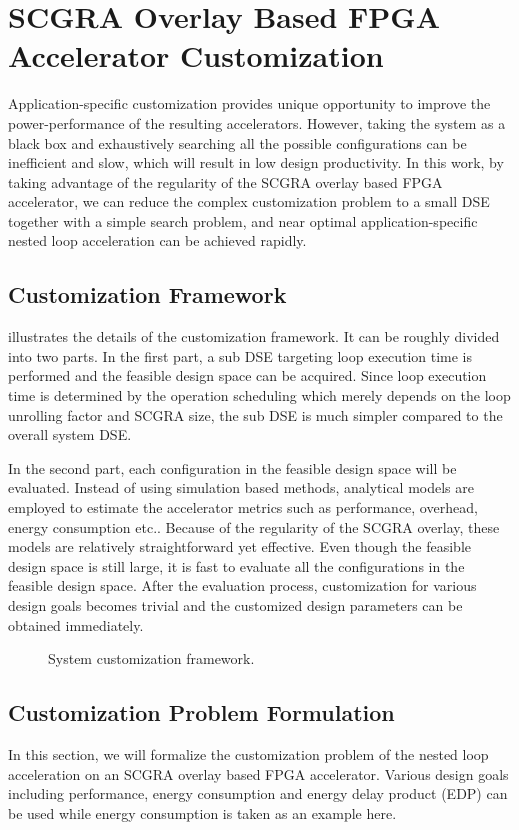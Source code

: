 \section{SCGRA Overlay Based FPGA Accelerator Customization} \label{sec:customization-framework}
Application-specific customization provides unique opportunity to improve 
the power-performance of the resulting accelerators. However, 
taking the system as a black box and exhaustively searching all the 
possible configurations can be inefficient and slow, which will 
result in low design productivity. In this work, by taking advantage 
of the regularity of the SCGRA overlay based FPGA accelerator, we 
can reduce the complex customization problem to a small DSE together with 
a simple search problem, and near optimal application-specific 
nested loop acceleration can be achieved rapidly.

\subsection{Customization Framework}
 illustrates the details 
of the customization framework. It can be roughly divided into two 
parts. In the first part, a sub DSE targeting loop execution time 
is performed and the feasible design space can be acquired. Since loop 
execution time is determined by the operation scheduling 
which merely depends on the loop unrolling factor and SCGRA size, the 
sub DSE is much simpler compared to the overall 
system DSE. 

In the second part, each configuration 
in the feasible design space will be evaluated. Instead of using simulation 
based methods, analytical models are employed to estimate the accelerator 
metrics such as performance, overhead, energy consumption etc.. 
Because of the regularity of the SCGRA overlay, these models are 
relatively straightforward yet effective. 
Even though the feasible design space is still large, it is fast to evaluate 
all the configurations in the feasible design space. After the evaluation process, 
customization for various design goals becomes trivial and the customized 
design parameters can be obtained immediately.

\begin{figure}[t]
\caption{System customization framework.}
\label{fig:customization-framework}
\end{figure}

\subsection{Customization Problem Formulation}
In this section, we will formalize the customization problem 
of the nested loop acceleration on an SCGRA overlay based FPGA accelerator. 
Various design goals including performance, energy consumption and 
energy delay product (EDP) can be used while energy consumption is taken 
as an example here.

